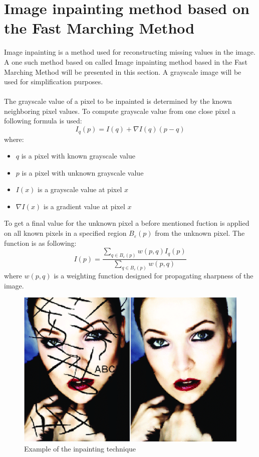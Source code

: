 \documentclass[twoside]{ctuthesis}
\theoremstyle{plain}
\theoremstyle{definition}
\theoremstyle{note}
\begin{document}
\section{Image inpainting method based on the Fast Marching Method}
Image inpainting is a method used for reconstructing missing values in the image. A one such method based on  called Image inpainting method based in the Fast Marching Method will be presented in this section. A grayscale image will be used for simplification purposes.\\
\\
The grayscale value of a pixel to be inpainted is determined by the known neighboring pixel values. To compute grayscale value from one close pixel a following formula is used:
\begin{equation}
	I_q(p)=I(q)+\nabla I(q)(p-q)
\end{equation}
where:
\begin{itemize}
	\item $q$ is a pixel with known grayscale value
	\item $p$ is a pixel with unknown grayscale value
	\item $I(x)$ is a grayscale value at pixel $x$
	\item $\nabla I(x)$ is a gradient value at pixel $x$
\end{itemize}
To get a final value for the unknown pixel a before mentioned fuction is applied on all known pixels in a specified region $B_{\varepsilon}(p)$ from the unknown pixel. The function is as following:
\begin{equation}
	I(p)=\frac{\sum_{q\in B_{\varepsilon}(p)}w(p,q)I_q(p)}{\sum_{q\in B_{\varepsilon}(p)}w(p,q)}
\end{equation}
where $w(p,q)$ is a weighting function designed for propagating sharpness of the image.\\
\begin{figure}[h!]
	\caption{Example of the inpainting technique}
	\includegraphics[width=\textwidth]{inpaint_example.png}
	\centering
\end{figure}\\
\end{document}

